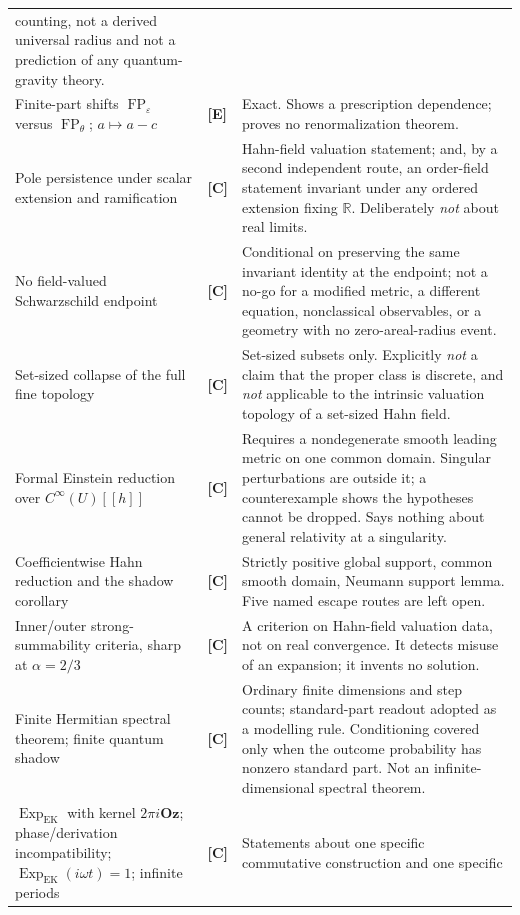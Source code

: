 \documentclass[11pt,letterpaper]{article}
\numberwithin{equation}{section}
\theoremstyle{definition}
\theoremstyle{remark}
\newcommand{\R}{\mathbb R}
\newcommand{\eps}{\varepsilon}
\DeclareMathOperator{\FP}{FP}
\newcommand{\Oz}{\mathbf{Oz}}
\newcommand{\ExpEK}{\operatorname{Exp}_{\mathrm{EK}}}
\newcommand{\TE}{\textcolor{TierE}{\textsf{\bfseries[E]}}}
\newcommand{\TC}{\textcolor{TierC}{\textsf{\bfseries[C]}}}
\begin{document}
\begin{longtable}{@{}L{0.28\textwidth}L{0.09\textwidth}L{0.55\textwidth}@{}}
counting, not a derived universal radius and not a prediction of any
quantum-gravity theory. \\
\addlinespace
Finite-part shifts $\FP_{\eps}$ versus $\FP_{\theta}$; $a\mapsto a-c$ &
\TE &
Exact. Shows a prescription dependence; proves no renormalization theorem. \\
\addlinespace
Pole persistence under scalar extension and ramification &
\TC &
Hahn-field valuation statement; and, by a second independent route, an
order-field statement invariant under any ordered extension fixing $\R$.
Deliberately \emph{not} about real limits. \\
\addlinespace
No field-valued Schwarzschild endpoint &
\TC &
Conditional on preserving the same invariant identity at the endpoint; not a
no-go for a modified metric, a different equation, nonclassical observables, or
a geometry with no zero-areal-radius event. \\
\addlinespace
Set-sized collapse of the full fine topology &
\TC &
Set-sized subsets only. Explicitly \emph{not} a claim that the proper class is
discrete, and \emph{not} applicable to the intrinsic valuation topology of a
set-sized Hahn field. \\
\addlinespace
Formal Einstein reduction over $C^{\infty}(U)[[h]]$ &
\TC &
Requires a nondegenerate smooth leading metric on one common domain. Singular
perturbations are outside it; a counterexample shows the hypotheses cannot be
dropped. Says nothing about general relativity at a singularity. \\
\addlinespace
Coefficientwise Hahn reduction and the shadow corollary &
\TC &
Strictly positive global support, common smooth domain, Neumann support lemma.
Five named escape routes are left open. \\
\addlinespace
Inner/outer strong-summability criteria, sharp at $\alpha=2/3$ &
\TC &
A criterion on Hahn-field valuation data, not on real convergence. It detects
misuse of an expansion; it invents no solution. \\
\addlinespace
Finite Hermitian spectral theorem; finite quantum shadow &
\TC &
Ordinary finite dimensions and step counts; standard-part readout adopted as a
modelling rule. Conditioning covered only when the outcome probability has
nonzero standard part. Not an infinite-dimensional spectral theorem. \\
\addlinespace
$\ExpEK$ with kernel $2\pi i\Oz$; phase/derivation incompatibility;
$\ExpEK(i\omega t)=1$; infinite periods &
\TC &
Statements about one specific commutative construction and one specific

\end{longtable}
\end{document}
